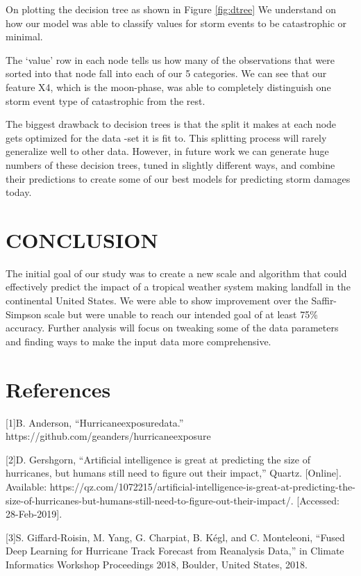 \documentclass[letterpaper, 10 pt, conference]{ieeeconf}  %
\begin{document}
On plotting the decision tree as shown in Figure \ref{fig:dtree} We understand on how our model was able to classify values for storm events to be catastrophic or minimal.

The ‘value’ row in each node tells us how many of the observations that were sorted into that node fall into each of our 5 categories. We can see that our feature X4, which is the moon-phase, was able to completely distinguish one storm event type of catastrophic from the rest.

The biggest drawback to decision trees is that the split it makes at each node gets optimized for the data -set it is fit to. This splitting process will rarely generalize well to other data. However, in future work we can generate huge numbers of these decision trees, tuned in slightly different ways, and combine their predictions to create some of our best models for predicting storm damages today.

\section{CONCLUSION}	The initial goal of our study was to create a new scale and algorithm that could effectively predict the impact of a tropical weather system making landfall in the continental United States. We were able to show improvement over the Saffir-Simpson scale but were unable to reach our intended goal of at least 75\% accuracy. Further analysis will focus on tweaking some of the data parameters and finding ways to make the input data more comprehensive.


\section{References}
[1]B. Anderson, “Hurricaneexposuredata.” https://github.com/geanders/hurricaneexposure

[2]D. Gershgorn, “Artificial intelligence is great at predicting the size of hurricanes, but humans still need to figure out their impact,” Quartz. [Online]. Available: https://qz.com/1072215/artificial-intelligence-is-great-at-predicting-the-size-of-hurricanes-but-humans-still-need-to-figure-out-their-impact/. [Accessed: 28-Feb-2019].

[3]S. Giffard-Roisin, M. Yang, G. Charpiat, B. Kégl, and C. Monteleoni, “Fused Deep Learning for Hurricane Track Forecast from Reanalysis Data,” in Climate Informatics Workshop Proceedings 2018, Boulder, United States, 2018.
\end{document}
